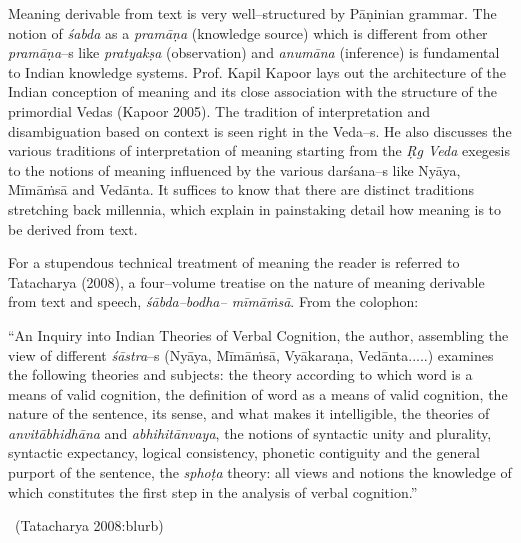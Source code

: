 Meaning derivable from text is very well–structured by Pāṇinian grammar. The notion of \textit{śabda} as a \textit{pramāṇa} (knowledge source) which is different from other \textit{pramāṇa}–s like \textit{pratyakṣa} (observation) and \textit{anumāna} (inference) is fundamental to Indian knowledge systems. Prof. Kapil Kapoor lays out the architecture of the Indian conception of meaning and its close association with the structure of the primordial Vedas (Kapoor 2005). The tradition of interpretation and disambiguation based on context is seen right in the Veda–s. He also discusses the various traditions of interpretation of meaning starting from the \textit{Ṛg Veda} exegesis to the notions of meaning influenced by the various darśana–s like Nyāya, Mīmāṁsā and Vedānta. It suffices to know that there are distinct traditions stretching back millennia, which explain in painstaking detail how meaning is to be derived from text.

For a stupendous technical treatment of meaning the reader is referred to Tatacharya (2008), a four–volume treatise on the nature of meaning derivable from text and speech, \textit{śābda–bodha– mīmāṁsā}. From the colophon:

\begin{myquote}
“An Inquiry into Indian Theories of Verbal Cognition, the author, assembling the view of different \textit{śāstra}–s (Nyāya, Mīmāṁsā, Vyākaraṇa, Vedānta.....) examines the following theories and subjects: the theory according to which word is a means of valid cognition, the definition of word as a means of valid cognition, the nature of the sentence, its sense, and what makes it intelligible, the theories of \textit{anvitābhidhāna} and \textit{abhihitānvaya}, the notions of syntactic unity and plurality, syntactic expectancy, logical consistency, phonetic contiguity and the general purport of the sentence, the \textit{sphoṭa} theory: all views and notions the knowledge of which constitutes the first step in the analysis of verbal cognition.”

~\hfill (Tatacharya 2008:blurb)
\end{myquote}

